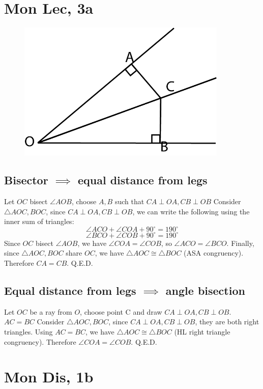 \documentclass[12pt]{article}
\newcommand{\degrees}{^{\circ}}
\begin{document}
\section{Mon Lec, 3a}
\begin{figure}[h]
    \includegraphics[width = 100mm]{GRAPH2.png}
\end{figure}
\subsection{Bisector $\implies$ equal distance from legs}
Let $OC$ bisect $\angle AOB$, choose $A, B$ such that $CA \perp OA, CB \perp OB$
\newline
Consider $\triangle AOC, BOC$, since $CA \perp OA, CB \perp OB$, we can write the following using the inner sum of triangles:
$$\angle ACO + \angle COA + 90 \degrees = 190 \degrees$$
$$\angle BCO + \angle COB + 90 \degrees = 190 \degrees$$
Since $OC$ bisect $\angle AOB$, we have $\angle COA = \angle COB$, so $\angle ACO = \angle BCO$. Finally, since $\triangle AOC, BOC$ share $OC$, we have $\triangle AOC \cong \triangle BOC$ (ASA congruency). Therefore $CA = CB$. Q.E.D.

\subsection{Equal distance from legs $\implies$ angle bisection}
Let $OC$ be a ray from $O$, choose point C and draw $CA \perp OA, CB \perp OB$. $AC = BC$
\newline
Consider $\triangle AOC, BOC$, since $CA \perp OA, CB \perp OB$, they are both right triangles. Using $AC = BC$, we have $\triangle AOC \cong \triangle BOC$ (HL right triangle congruency). Therefore $\angle COA = \angle COB$.
Q.E.D.

\section{Mon Dis, 1b}
\end{document}
